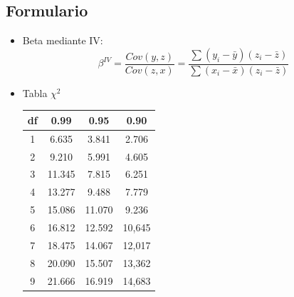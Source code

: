 \documentclass[10pt,a4paper]{article}
\begin{document}
\begin{enumerate}





\newpage
\section*{Formulario}
\begin{itemize}

\item Beta mediante IV:
$$\beta^{IV}=\frac{Cov(y,z)}{Cov(z,x)}=\frac{\sum (y_i - \bar{y})(z_i - \bar{z})}{\sum (x_i - \bar{x})(z_i - \bar{z})}$$

\item Tabla $\chi^2$
\begin{center}
    \begin{tabular}{|c|c|c|c|}
    \hline
        df & 0.99 & 0.95 & 0.90 \\ 
        \hline
        1 &  6.635 & 3.841 & 2.706\\
        \hline
        2 &  9.210 & 5.991 & 4.605 \\
        \hline
        3 & 11.345 & 7.815 & 6.251  \\
        \hline
        4 &  13.277 & 9.488 & 7.779 \\
        \hline
        5 &  15.086 & 11.070 & 9.236 \\
        \hline
        6 &  16.812 & 12.592 & 10,645 \\
        \hline
        7 &  18.475 & 14.067 & 12,017 \\
        \hline
        8 &  20.090 & 15.507 & 13,362 \\
        \hline
        9 &  21.666 & 16.919 & 14,683 \\
        \hline
    \end{tabular}
\end{center}


\end{itemize}
\end{enumerate}
\end{document}
